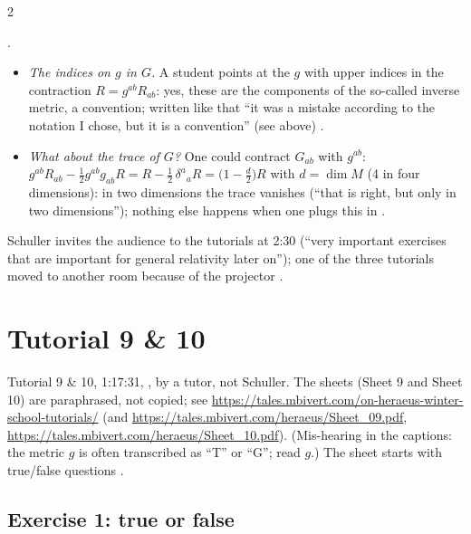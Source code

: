 \begin{paracol}{2}
\begin{aside}
.
\end{aside}
\begin{coursenote}
\begin{itemize}
  \item \emph{The indices on $g$ in $G$.} A student points at the $g$ with upper indices in the contraction $R=g^{ab}R_{ab}$: yes, these are the components of the so-called inverse metric, a convention; written like that ``it was a mistake according to the notation I chose, but it is a convention'' (see above) .
  \item \emph{What about the trace of $G$?} One could contract $G_{ab}$ with $g^{ab}$: $g^{ab}R_{ab}-\tfrac12g^{ab}g_{ab}R=R-\tfrac12\,\delta^a{}_aR=\bigl(1-\tfrac d2\bigr)R$ with $d=\dim M$ (4 in four dimensions): in two dimensions the trace vanishes (``that is right, but only in two dimensions''); nothing else happens when one plugs this in .
\end{itemize}
\end{coursenote}
Schuller invites the audience to the tutorials at 2:30 (``very important exercises that are important for general relativity later on''); one of the three tutorials moved to another room because of the projector .

\section{Tutorial 9 \& 10}\label{sec:t10-1}

Tutorial 9 \& 10, 1:17:31, , by a tutor, not Schuller. The sheets (Sheet 9 and Sheet 10) are paraphrased, not copied; see \url{https://tales.mbivert.com/on-heraeus-winter-school-tutorials/} (and \url{https://tales.mbivert.com/heraeus/Sheet_09.pdf}, \url{https://tales.mbivert.com/heraeus/Sheet_10.pdf}). (Mis-hearing in the captions: the metric $g$ is often transcribed as ``T'' or ``G''; read $g$.) The sheet starts with true/false questions .

\subsection*{Exercise 1: true or false}


\end{paracol}
